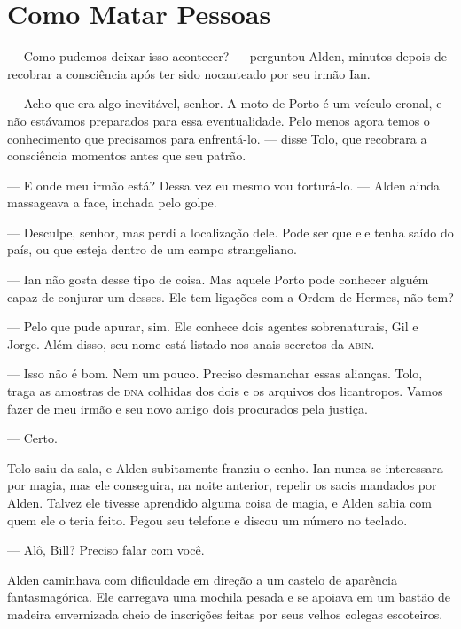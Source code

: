 \chapter{Como Matar Pessoas}

\date{Barretos, São Paulo}

--- Como pudemos deixar isso acontecer? --- perguntou Alden, minutos depois de
recobrar a consciência após ter sido nocauteado por seu irmão Ian.

--- Acho que era algo inevitável, senhor. A moto de Porto é um veículo cronal,
e não estávamos preparados para essa eventualidade. Pelo menos agora temos o
conhecimento que precisamos para enfrentá-lo. --- disse Tolo, que recobrara a
consciência momentos antes que seu patrão.

--- E onde meu irmão está? Dessa vez eu mesmo vou torturá-lo. --- Alden ainda
massageava a face, inchada pelo golpe.

--- Desculpe, senhor, mas perdi a localização dele. Pode ser que ele tenha
saído do país, ou que esteja dentro de um campo strangeliano.

--- Ian não gosta desse tipo de coisa. Mas aquele Porto pode conhecer alguém
capaz de conjurar um desses. Ele tem ligações com a Ordem de Hermes, não tem?

--- Pelo que pude apurar, sim. Ele conhece dois agentes sobrenaturais, Gil e
Jorge. Além disso, seu nome está listado nos anais secretos da \textsc{abin}.

--- Isso não é bom. Nem um pouco. Preciso desmanchar essas alianças. Tolo,
traga as amostras de \textsc{dna} colhidas dos dois e os arquivos dos
licantropos. Vamos fazer de meu irmão e seu novo amigo dois procurados pela
justiça.

--- Certo.

Tolo saiu da sala, e Alden subitamente franziu o cenho. Ian nunca se
interessara por magia, mas ele conseguira, na noite anterior, repelir os sacis
mandados por Alden. Talvez ele tivesse aprendido alguma coisa de magia, e Alden
sabia com quem ele o teria feito. Pegou seu telefone e discou um número no
teclado.

--- Alô, Bill? Preciso falar com você.


Alden caminhava com dificuldade em direção a um castelo de aparência
fantasmagórica. Ele carregava uma mochila pesada e se apoiava em um bastão de
madeira envernizada cheio de inscrições feitas por seus velhos colegas
escoteiros.

